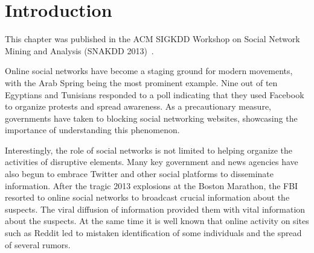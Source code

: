 \section{Introduction}
This chapter was published in the ACM SIGKDD Workshop on Social Network
Mining and Analysis (SNAKDD 2013)~\cite{jin2013epidemiological}.

Online social networks have become a staging ground for modern
movements, with the Arab Spring being the most prominent example.
Nine out of ten Egyptians and Tunisians responded to a poll indicating
that they used Facebook to organize protests and spread awareness.
As a precautionary measure, governments have taken to
blocking social networking websites, showcasing the importance of understanding
this phenomenon.

Interestingly, the role of social networks is not limited to
helping organize the activities of disruptive elements.
Many key government and news
agencies have also begun to embrace Twitter and other social platforms
to disseminate information.
After the tragic 2013 explosions at the Boston Marathon, the
FBI resorted to online social networks to broadcast crucial information
about the suspects. The viral diffusion of information provided them with
vital information about the suspects.
At the same time it is well known
that online activity on sites
such as Reddit led to mistaken identification of some individuals
and the spread of several rumors.

